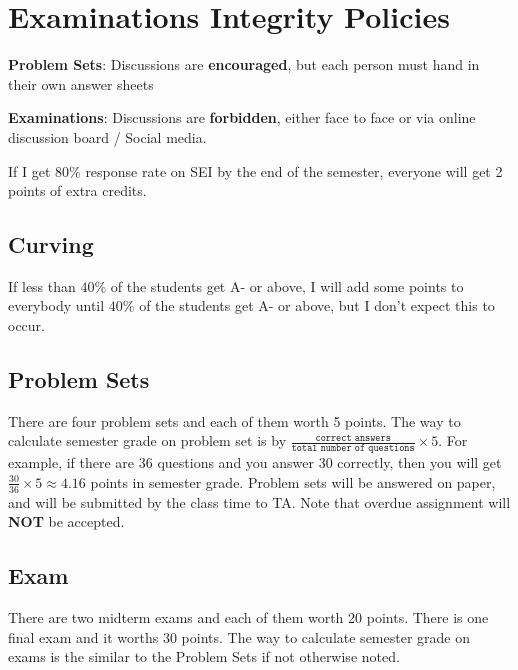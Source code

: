 \documentclass[12pt]{article}
\begin{document}
\section*{Examinations Integrity Policies}

\textbf{Problem Sets}: Discussions are \textbf{encouraged}, but each person must hand in their own answer sheets

\textbf{Examinations}: Discussions are \textbf{forbidden}, either face to face or via online discussion board / Social media.

If I get $80\%$ response rate on SEI by the end of the semester, everyone will get 2 points of extra credits.
\subsection*{Curving}

If less than $40\%$ of the students get A- or above, I will add some points to everybody until $40\%$ of the students get A- or above, but I don't expect this to occur.
\subsection*{Problem Sets}
\label{sub:Problem_Sets}

There are four problem sets and each of them worth 5 points.
The way to calculate semester grade on problem set is by $ \frac{ \texttt{correct answers} }{ \texttt{total number of questions} } \times 5 $.
For example, if there are 36 questions and you answer 30 correctly, then you will get $ \frac{30}{36} \times 5 \approx 4.16$ points in semester grade.
Problem sets will be answered on paper, and will be submitted by the class time to TA.
Note that overdue assignment will \textbf{NOT} be accepted.

\subsection*{Exam}
\label{sub:Exam}

There are two midterm exams and each of them worth 20 points.
There is one final exam and it worths 30 points.
The way to calculate semester grade on exams is the similar to the Problem Sets if not otherwise noted.
\end{document}
